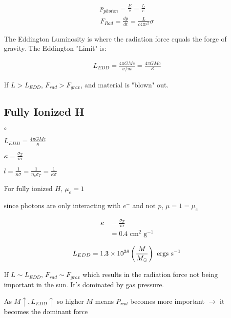 \begin{align}
p_{photon} = \frac{E}{c} = \frac{L}{c}\\
F_{Rad} = \frac{dp}{dt} = \frac{L}{c 4\pi r^2} \sigma
\end{align}

The Eddington Luminosity is where the radiation force equals the forge of gravity. The Eddington "Limit" is:

\begin{align}
L_{EDD} = \frac{4 \pi G Mc}{\sigma /m} = \frac{4 \pi G Mc}{\kappa}
\end{align}

If $L > L_{EDD}$, $F_{rad} > F_{grav}$, and material is "blown" out. 

\subsection{Fully Ionized H}

\begin{list}{$\circ$}{}
\item $L_{EDD} = \frac{4 \pi GMc}{\kappa}$
\item $\kappa = \frac{\sigma_T}{m}$
\item $l = \frac{1}{n \sigma} = \frac{1}{n_e \sigma_T} = \frac{1}{\kappa \sigma}$
\item For fully ionized $H$, $\mu_e =1$
\item since photons are only interacting with $e^-$ and not $p$, $\mu = 1 = \mu_e$
\end{list}

\begin{align}
\kappa &= \frac{\sigma_T}{m}\\
&= 0.4\text{ cm}^2\text{ g}^{-1}
\end{align}

\begin{align}
L_{EDD} = 1.3 \times 10^{38} \left( \frac{M}{M_\odot} \right) \text{ ergs s}^{-1}
\end{align}

\begin{list}{}{}
\item If $L \sim L_{EDD}$, $F_{rad} \sim F_{grav}$ which results in the radiation force not being important in the sun. It's dominated by gas pressure.
\item As $M \uparrow, L_{EDD} \uparrow$ so higher $M$ means $P_{rad}$ becomes more important $\rightarrow$ it becomes the dominant force
\end{list}
